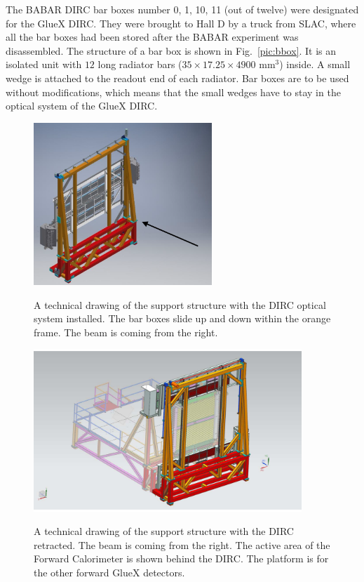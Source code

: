 The BABAR DIRC bar boxes number 0, 1, 10, 11 (out of twelve) were designated for the GlueX DIRC. They were brought to Hall D by a truck from SLAC, where all the bar boxes had been stored after the BABAR experiment was disassembled. The structure of a bar box is shown in Fig.~\ref{pic:bbox}. It is an isolated unit with $12$ long radiator bars ($35 \times 17.25 \times 4900 $ mm$^3$) inside. A small wedge is attached to the readout end of each radiator. Bar boxes are to be used without modifications, which means that the small wedges have to stay in the optical system of the GlueX DIRC.

\begin{figure}[h]
\centering
\includegraphics[width=0.6\textwidth]{pics/support.png} 
\caption{\label{pic:support}} A technical drawing of the support structure with the DIRC optical system installed. The bar boxes slide up and down within the orange frame. The beam is coming from the right.
\end{figure}

\begin{figure}[!h]
\centering
\includegraphics[width=0.9\textwidth]{pics/Full_Assy_Iso-retracted.pdf}
\caption{\label{pic:retracted}} A technical drawing of the support structure with the DIRC retracted. The beam is coming from the right. The active area of the Forward Calorimeter is shown behind the DIRC. The platform is for the other forward GlueX detectors.
\end{figure}

